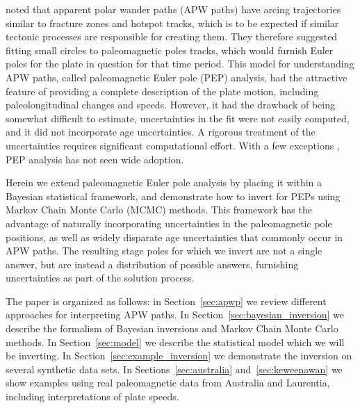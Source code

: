 \documentclass[preprint,12pt,authoryear]{elsarticle}
\begin{document}
\citet{gordon1984paleomagnetic} noted that apparent polar wander paths (APW paths) have 
arcing trajectories similar to fracture zones and hotspot tracks, which is
to be expected if similar tectonic processes are responsible for creating them.
They therefore suggested fitting small circles to paleomagnetic poles tracks,
which would furnish Euler poles for the plate in question for that time period.
This model for understanding APW paths, called paleomagnetic Euler pole (PEP) analysis,
 had the attractive feature of providing a complete description of the plate motion, 
including paleolongitudinal changes and speeds. 
However, it had the drawback of being somewhat difficult to estimate,
uncertainties in the fit were not easily computed, 
and it did not incorporate age uncertainties. 
A rigorous treatment of the uncertainties requires significant computational effort.
With a few exceptions \citep[e.g.][]{beck1989paleomagnetism, tarling1996palaeomagnetic, bryan1986rotation, beck2003absolute, smirnov2010co},
PEP analysis has not seen wide adoption.

Herein we extend paleomagnetic Euler pole analysis by placing it within
a Bayesian statistical framework, and demonstrate how to invert for PEPs
using Markov Chain Monte Carlo (MCMC) methods. This framework has the advantage
of naturally incorporating uncertainties in the paleomagnetic pole positions,
as well as widely disparate age uncertainties that commonly occur in APW paths.
The resulting stage poles for which we invert are not a single answer, but are instead
a distribution of possible answers, furnishing uncertainties as part of the solution process.

The paper is organized as follows: in Section~\ref{sec:apwp} we review different
approaches for interpreting APW paths. In Section~\ref{sec:bayesian_inversion} we
describe the formalism of Bayesian inversions and Markov Chain Monte Carlo methods.
In Section~\ref{sec:model} we describe the statistical model which we will be inverting.
In Section~\ref{sec:example_inversion} we demonstrate the inversion on several
synthetic data sets. In Sections~\ref{sec:australia} and~\ref{sec:keweenawan}
we show examples using real paleomagnetic data from Australia and Laurentia,
including interpretations of plate speeds.
\end{document}
